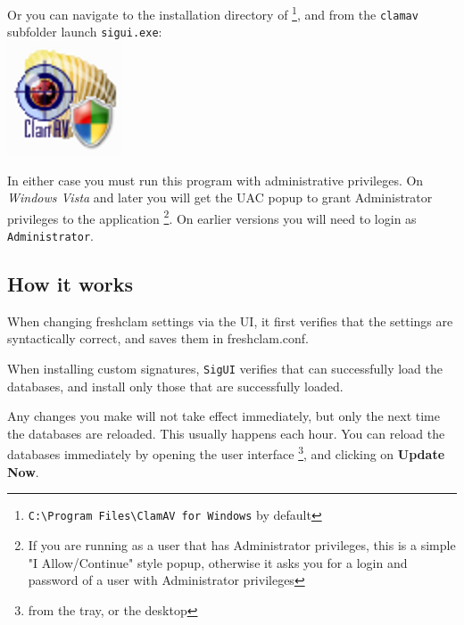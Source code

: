 Or you can navigate to the installation directory of \CW \footnote{\texttt{C:\textbackslash Program Files\textbackslash ClamAV for Windows} by default}, and from the \texttt{clamav} subfolder launch \texttt{sigui.exe}:\\ \includegraphics[scale=0.5]{sigui_icon.png}

In either case you must run this program with administrative privileges.
On \emph{Windows Vista} and later you will get the UAC popup to grant Administrator privileges to the application \footnote{If you are running as a user that has Administrator privileges, this is a simple "I Allow/Continue" style popup, otherwise it asks you for a login and password of a user with Administrator privileges}. On earlier versions you will need to login as \verb+Administrator+.

\subsection{How it works}

When changing \gls{freshclam} settings via the UI, it first verifies that the
settings are syntactically correct, and saves them in \gls{freshclam.conf}.

When installing custom signatures, \verb+SigUI+ verifies that \ClamAV can successfully load the databases, and install only those that are successfully loaded.

Any changes you make will not take effect immediately, but only the next time the databases are reloaded. This usually happens each hour. You can reload the databases immediately by opening the \CW user interface \footnote{from the tray, or the desktop}, and clicking on \textbf{Update Now}.

